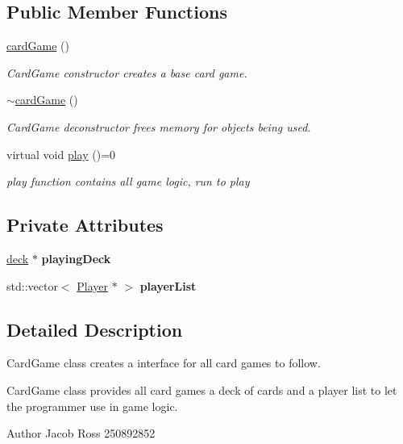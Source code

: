 \subsection*{Public Member Functions}
\begin{DoxyCompactItemize}
\item 
\hyperlink{classcardGame_a9f128c2ea5d426a79b506ed02771bdbc}{card\+Game} ()
\begin{DoxyCompactList}\small\item\em Card\+Game constructor creates a base card game. \end{DoxyCompactList}\item 
\hyperlink{classcardGame_a23e7135b422d487d761b475713cf2e7a}{$\sim$card\+Game} ()
\begin{DoxyCompactList}\small\item\em Card\+Game deconstructor frees memory for objects being used. \end{DoxyCompactList}\item 
virtual void \hyperlink{classcardGame_ae8e04249f37f61e3adfa03cfbad3b021}{play} ()=0
\begin{DoxyCompactList}\small\item\em play function contains all game logic, run to play \end{DoxyCompactList}\end{DoxyCompactItemize}
\subsection*{Private Attributes}
\begin{DoxyCompactItemize}
\item 
\mbox{\label{classcardGame_aa0db8fdd6a95e1dda328150c5bc6ed94}} 
\hyperlink{classdeck}{deck} $\ast$ {\bfseries playing\+Deck}
\item 
\mbox{\label{classcardGame_ad90e58da175c9cb069c8617d9455562d}} 
std\+::vector$<$ \hyperlink{classPlayer}{Player} $\ast$ $>$ {\bfseries player\+List}
\end{DoxyCompactItemize}


\subsection{Detailed Description}
Card\+Game class creates a interface for all card games to follow. 

Card\+Game class provides all card games a deck of cards and a player list to let the programmer use in game logic. \begin{DoxyAuthor}{Author}
Jacob Ross 250892852 
\end{DoxyAuthor}


